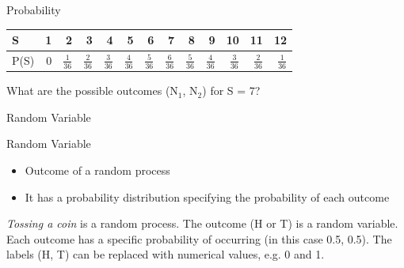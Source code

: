 \begin{frame}{Probability}
    \begin{tabular}{l | r r r r r r r r r r r r}
        S & 1 & 2 & 3 & 4 & 5 & 6 & 7 & 8 & 9 & 10 & 11 & 12 \\
        \hline
        P(S) & 0 & $\frac{1}{36}$ & $\frac{2}{36}$ & $\frac{3}{36}$ & $\frac{4}{36}$ & $\frac{5}{36}$ & $\frac{6}{36}$ & $\frac{5}{36}$ & $\frac{4}{36}$ & $\frac{3}{36}$ & $\frac{2}{36}$ & $\frac{1}{36}$ \\
    \end{tabular}
    
    \medskip
    \begin{example}
        What are the possible outcomes (N$_1$, N$_2$) for S = 7?
    \end{example}

\end{frame}

\begin{frame}{Random Variable}
    \begin{block}{Random Variable}
    
    \begin{itemize}
    \item Outcome of a random process
    \item It has a probability distribution specifying the probability of each outcome
    \end{itemize}
    
    \begin{example}
    \medskip
    \emph{Tossing a coin} is a random process. The outcome (H or T) is a random variable. Each outcome has a specific probability of occurring (in this case 0.5, 0.5). The labels (H, T) can be replaced with numerical values, e.g. 0 and 1.
    \end{example}
    
    
    \end{block}
\end{frame}

